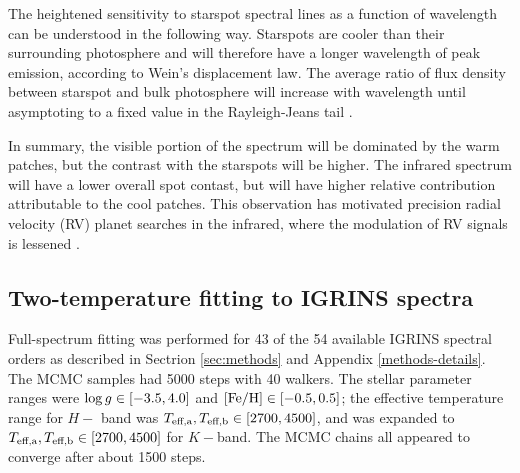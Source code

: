 \documentclass[twocolumn]{emulateapj}%
\begin{document}
The heightened sensitivity to starspot spectral lines as a function of wavelength can be understood in the following way.  Starspots are cooler than their surrounding photosphere and will therefore have a longer wavelength of peak emission, according to Wein's displacement law.  The average ratio of flux density between starspot and bulk photosphere will increase with wavelength until asymptoting to a fixed value in the Rayleigh-Jeans tail \citep{wolk96}.


In summary, the visible portion of the spectrum will be dominated by the warm patches, but the contrast with the starspots will be higher.  The infrared spectrum will have a lower overall spot contast, but will have higher relative contribution attributable to the cool patches.  This observation has motivated precision radial velocity (RV) planet searches in the infrared, where the modulation of RV signals is lessened \citep{prato08}.


\subsection{Two-temperature fitting to IGRINS spectra}

Full-spectrum fitting was performed for 43 of the 54 available IGRINS spectral orders as described in Sectrion \ref{sec:methods} and Appendix \ref{methods-details}.  The MCMC samples had 5000 steps with 40 walkers.  The stellar parameter ranges were $\log g \in [-3.5, 4.0]$ and $[{\rm Fe}/{\rm H}] \in [-0.5, 0.5]$; the effective temperature range for $H-$ band was $T_\textrm{eff,a}, T_\textrm{eff,b} \in [2700, 4500]$, and was expanded to $T_\textrm{eff,a}, T_\textrm{eff,b} \in [2700, 4500]$ for $K-$band.  The MCMC chains all appeared to converge after about 1500 steps.
\end{document}
